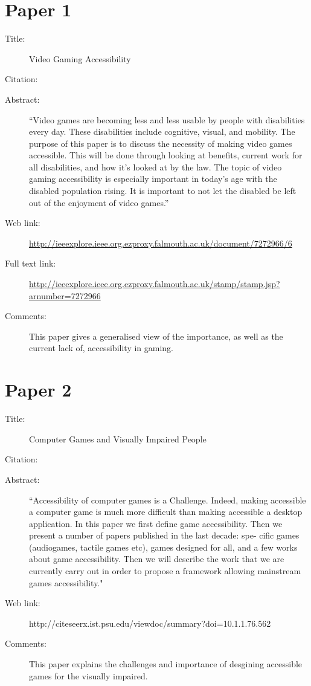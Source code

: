 \documentclass{scrartcl}
\begin{document}
\section*{Paper 1}
\begin{description}
\item[Title:] Video Gaming Accessibility
\item[Citation:] \cite{D.McPheron}
\item[Abstract:] ``Video games are becoming less and less usable by people with disabilities every day. These disabilities include cognitive, visual, and mobility. The purpose of this paper is to discuss the necessity of making video games accessible. This will be done through looking at benefits, current work for all disabilities, and how it's looked at by the law. The topic of video gaming accessibility is especially important in today's age with the disabled population rising. It is important to not let the disabled be left out of the enjoyment of video games.''
\item[Web link:] \url{http://ieeexplore.ieee.org.ezproxy.falmouth.ac.uk/document/7272966/6}
\item[Full text link:] \url{http://ieeexplore.ieee.org.ezproxy.falmouth.ac.uk/stamp/stamp.jsp?arnumber=7272966}
\item[Comments:] This paper gives a generalised view of the importance, as well as the current lack of, accessibility in gaming. 
\end{description}

\section*{Paper 2}
\begin{description}
\item[Title:] Computer Games and Visually Impaired People
\item[Citation:] \cite{Archambault}
\item[Abstract:] ``Accessibility of computer games is a Challenge. Indeed, making accessible a computer game is much more difficult than making accessible a desktop application. In this paper we first define game accessibility. Then we present a number of papers published in the last decade: spe- cific games (audiogames, tactile games etc), games designed for all, and a few works about game accessibility. Then we will describe the work that we are currently carry out in order to propose a framework allowing mainstream games accessibility."
\item[Web link:] http://citeseerx.ist.psu.edu/viewdoc/summary?doi=10.1.1.76.562
\item[Comments:] This paper explains the challenges and importance of desgining accessible games for the visually impaired.
\end{description}
\end{document}
